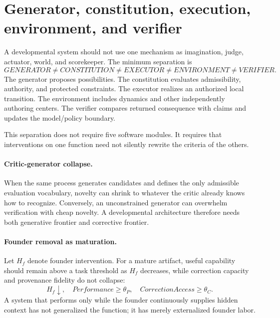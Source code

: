 \section{Generator, constitution, execution, environment, and verifier}
\label{sec:deep-developmental}

A developmental system should not use one mechanism as imagination, judge, actuator, world, and scorekeeper. The minimum separation is
\begin{equation}
GENERATOR\neq CONSTITUTION\neq EXECUTOR\neq ENVIRONMENT\neq VERIFIER.
\label{eq:deep-separation}
\end{equation}
The generator proposes possibilities. The constitution evaluates admissibility, authority, and protected constraints. The executor realizes an authorized local transition. The environment includes dynamics and other independently authoring centers. The verifier compares returned consequence with claims and updates the model/policy boundary.

This separation does not require five software modules. It requires that interventions on one function need not silently rewrite the criteria of the others.

\paragraph{Critic-generator collapse.}
When the same process generates candidates and defines the only admissible evaluation vocabulary, novelty can shrink to whatever the critic already knows how to recognize. Conversely, an unconstrained generator can overwhelm verification with cheap novelty. A developmental architecture therefore needs both generative frontier and corrective frontier.

\paragraph{Founder removal as maturation.}
Let $H_f$ denote founder intervention. For a mature artifact, useful capability should remain above a task threshold as $H_f$ decreases, while correction capacity and provenance fidelity do not collapse:
\begin{equation}
H_f\downarrow,\quad Performance\ge\theta_P,\quad CorrectionAccess\ge\theta_C.
\label{eq:deep-founder}
\end{equation}
A system that performs only while the founder continuously supplies hidden context has not generalized the function; it has merely externalized founder labor.

